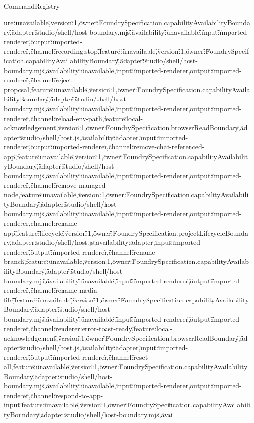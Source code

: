\begin{lexlean}{CommandRegistry}
\begin{semanticmodule}
{ure\":\"unavailable\",\"version\":1,\"owner\":\"FoundrySpecification.capabilityAvailabilityBoundary\",\"adapter\":\"studio/shell/host-boundary.mjs\",\"availability\":\"unavailable\",\"input\":\"imported-renderer\",\"output\":\"imported-renderer\"},{\"channel\":\"recording:stop\",\"feature\":\"unavailable\",\"version\":1,\"owner\":\"FoundrySpecification.capabilityAvailabilityBoundary\",\"adapter\":\"studio/shell/host-boundary.mjs\",\"availability\":\"unavailable\",\"input\":\"imported-renderer\",\"output\":\"imported-renderer\"},{\"channel\":\"reject-proposal\",\"feature\":\"unavailable\",\"version\":1,\"owner\":\"FoundrySpecification.capabilityAvailabilityBoundary\",\"adapter\":\"studio/shell/host-boundary.mjs\",\"availability\":\"unavailable\",\"input\":\"imported-renderer\",\"output\":\"imported-renderer\"},{\"channel\":\"reload-env-path\",\"feature\":\"local-acknowledgement\",\"version\":1,\"owner\":\"FoundrySpecification.browserReadBoundary\",\"adapter\":\"studio/shell/host.js\",\"availability\":\"adapter\",\"input\":\"imported-renderer\",\"output\":\"imported-renderer\"},{\"channel\":\"remove-chat-referenced-app\",\"feature\":\"unavailable\",\"version\":1,\"owner\":\"FoundrySpecification.capabilityAvailabilityBoundary\",\"adapter\":\"studio/shell/host-boundary.mjs\",\"availability\":\"unavailable\",\"input\":\"imported-renderer\",\"output\":\"imported-renderer\"},{\"channel\":\"remove-managed-node\",\"feature\":\"unavailable\",\"version\":1,\"owner\":\"FoundrySpecification.capabilityAvailabilityBoundary\",\"adapter\":\"studio/shell/host-boundary.mjs\",\"availability\":\"unavailable\",\"input\":\"imported-renderer\",\"output\":\"imported-renderer\"},{\"channel\":\"rename-app\",\"feature\":\"lifecycle\",\"version\":1,\"owner\":\"FoundrySpecification.projectLifecycleBoundary\",\"adapter\":\"studio/shell/host.js\",\"availability\":\"adapter\",\"input\":\"imported-renderer\",\"output\":\"imported-renderer\"},{\"channel\":\"rename-branch\",\"feature\":\"unavailable\",\"version\":1,\"owner\":\"FoundrySpecification.capabilityAvailabilityBoundary\",\"adapter\":\"studio/shell/host-boundary.mjs\",\"availability\":\"unavailable\",\"input\":\"imported-renderer\",\"output\":\"imported-renderer\"},{\"channel\":\"rename-media-file\",\"feature\":\"unavailable\",\"version\":1,\"owner\":\"FoundrySpecification.capabilityAvailabilityBoundary\",\"adapter\":\"studio/shell/host-boundary.mjs\",\"availability\":\"unavailable\",\"input\":\"imported-renderer\",\"output\":\"imported-renderer\"},{\"channel\":\"renderer:error-toast-ready\",\"feature\":\"local-acknowledgement\",\"version\":1,\"owner\":\"FoundrySpecification.browserReadBoundary\",\"adapter\":\"studio/shell/host.js\",\"availability\":\"adapter\",\"input\":\"imported-renderer\",\"output\":\"imported-renderer\"},{\"channel\":\"reset-all\",\"feature\":\"unavailable\",\"version\":1,\"owner\":\"FoundrySpecification.capabilityAvailabilityBoundary\",\"adapter\":\"studio/shell/host-boundary.mjs\",\"availability\":\"unavailable\",\"input\":\"imported-renderer\",\"output\":\"imported-renderer\"},{\"channel\":\"respond-to-app-input\",\"feature\":\"unavailable\",\"version\":1,\"owner\":\"FoundrySpecification.capabilityAvailabilityBoundary\",\"adapter\":\"studio/shell/host-boundary.mjs\",\"avai}
\end{semanticmodule}
\end{lexlean}
